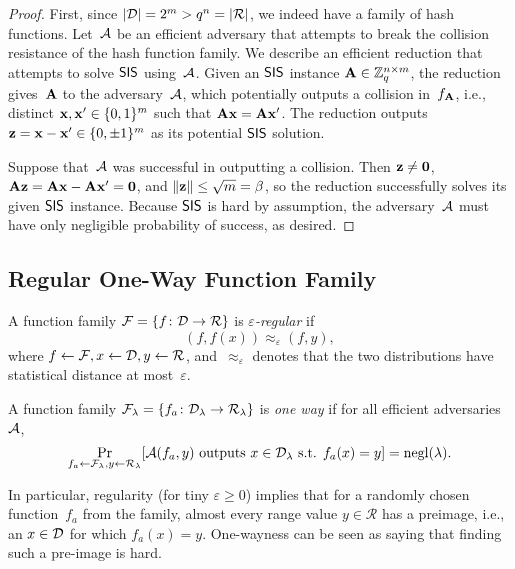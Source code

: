 \documentclass[11pt]{article}
\newcommand{\calR}{\ensuremath{\mathcal{R}}}
\begin{document}
\begin{proof}
  First, since $\abs{\calD}=2^{m} > q^{n} = \abs{\calR}$, we indeed
  have a family of hash functions. Let~$\mathcal{A}$ be an efficient
  adversary that attempts to break the collision resistance of the
  hash function family. We describe an efficient reduction that
  attempts to solve $\mathsf{SIS}$ using~$\mathcal{A}$. Given an $\mathsf{SIS}$ instance
  $\mathbf{A} \in \mathbb{Z}_q^{n \times m}$, the reduction gives~$\mathbf{A}$ to the
  adversary~$\mathcal{A}$, which potentially outputs a collision
  in~$f_{\mathbf{A}}$, i.e., distinct $\mathbf{x}, \mathbf{x}' \in \{0,1\}^{m}$ such
  that $\mathbf{A}\mathbf{x}=\mathbf{A}\mathbf{x}'$. The reduction outputs
  $\mathbf{z} = \mathbf{x}-\mathbf{x}' \in \{0, \pm 1\}^{m}$ as its potential
  $\mathsf{SIS}$ solution.

  Suppose that~$\mathcal{A}$ was successful in outputting a collision. Then
  $\mathbf{z} \neq \mathbf{0}$,
  $\mathbf{A}\mathbf{z} = \mathbf{A}\mathbf{x} - \mathbf{A}\mathbf{x}' = \mathbf{0}$, and
  $\lVert\mathbf{z}\rVert \leq \sqrt{m} = \beta$, so the reduction
  successfully solves its given $\mathsf{SIS}$ instance. Because $\mathsf{SIS}$ is
  hard by assumption, the adversary~$\mathcal{A}$ must have only negligible
  probability of success, as desired.
\end{proof}

\subsection{Regular One-Way Function Family}
\label{sec:regular-one-way}

\begin{definition}
  \label{def:regular}
  A function family $\calF = \set{f \colon \calD \to \calR}$ is
  \emph{$\varepsilon$-regular} if
  \[ (f, f(x)) \approx_{\varepsilon} (f, y) , \] where
  $f \gets \calF, x \gets \calD, y \gets \calR$,
  and~$\approx_{\varepsilon}$ denotes that the two distributions have
  statistical distance at most~$\varepsilon$.
\end{definition}

\begin{definition}
  \label{def:one-way}
  A function family
  $\calF_{\lambda} = \set{f_{a} \colon \calD_{\lambda} \to
    \calR_{\lambda}}$ is \emph{one way} if for all efficient
  adversaries~$\mathcal{A}$,
  \[\Pr_{f_a \gets \calF_{\lambda}, y \gets \calR_{\lambda}}[\Adv(f_a,
    y) \text{ outputs } x \in \calD_{\lambda} \text{ s.t. } f_a(x)=y]
    = \negl(\lambda) . \]
\end{definition}

In particular, regularity (for tiny $\varepsilon \geq 0$) implies that
for a randomly chosen function~$f_{a}$ from the family, almost every
range value $y \in \calR$ has a preimage, i.e., an $x \in \mathcal{D}$ for
which $f_{a}(x)=y$. One-wayness can be seen as saying that finding
such a pre-image is hard.
\end{document}
